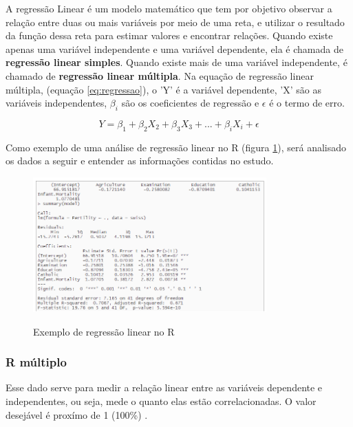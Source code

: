 A regressão Linear é um modelo matemático que tem por objetivo observar a relação entre duas ou mais variáveis por meio de uma reta, e utilizar o resultado da função dessa reta para estimar valores e encontrar relações. Quando existe apenas uma variável independente e uma variável dependente, ela é chamada de \textbf{regressão linear simples}. Quando existe mais de uma variável independente, é chamado de \textbf{regressão linear múltipla}. Na equação de regressão linear múltipla, (equação \ref*{eq:regressao}), o 'Y' é a variável dependente, 'X' são as variáveis independentes, $\beta_i$ são os coeficientes de regressão e $\epsilon$ é o termo de erro\cite{5}. 

\begin{equation}
    Y = \beta_1 + \beta_2X_2 + \beta_3X_3 + ... + \beta_iX_i + \epsilon  
    \label{eq:regressao}  
\end{equation}

Como exemplo de uma análise de regressão linear no R (figura \ref*{fig:R}), será analisado os dados a seguir e entender as informações contidas no estudo.
 
\begin{figure}[h]

    \caption{Exemplo de regressão linear no R \cite{5}}
    \centering
    \includegraphics[width=0.8\textwidth]{images/R.png}
    \label{fig:R}
    
\end{figure}

\subsubsection*{R múltiplo}

Esse dado serve para medir a relação linear entre as variáveis dependente e independentes, ou seja, mede o quanto elas estão correlacionadas. O valor desejável é proxímo de 1 (100\%) \cite{5}.

